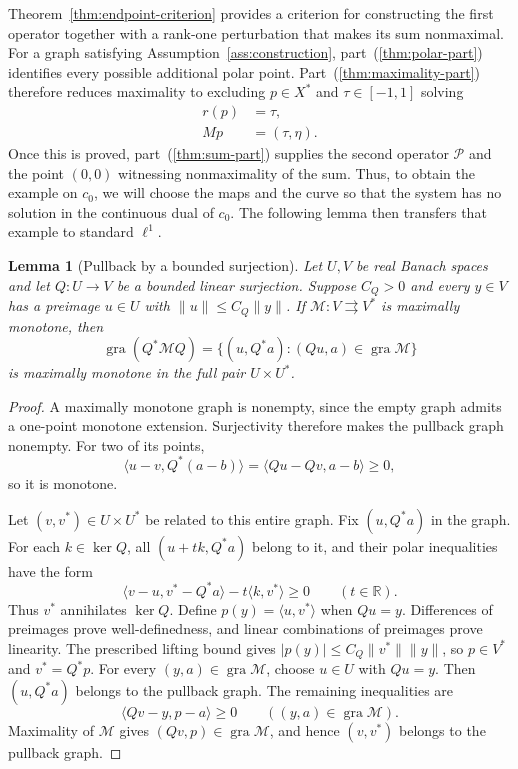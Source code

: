 \documentclass[11pt]{article}
\newcommand{\R}{\mathbb R}
\newcommand{\gra}{\operatorname{gra}}
\newcommand{\pair}[2]{\langle #1,#2\rangle}
\newtheorem{lemma}{Lemma}
\theoremstyle{definition}
\theoremstyle{remark}
\begin{document}
Theorem~\ref{thm:endpoint-criterion} provides a criterion for constructing
the first operator together with a rank-one perturbation that makes its
sum nonmaximal. For a graph satisfying Assumption~\ref{ass:construction}, part~\textup{(\ref{thm:polar-part})}
identifies every possible additional polar point. Part~\textup{(\ref{thm:maximality-part})} therefore
reduces maximality to excluding $p\in X^*$ and $\tau\in[-1,1]$ solving
\[
\begin{aligned}
r(p)&=\tau,\\
Mp&=(\tau,\eta).
\end{aligned}
\]
Once this is proved, part~\textup{(\ref{thm:sum-part})} supplies the second
operator $\mathcal P$ and the point $(0,0)$ witnessing nonmaximality
of the sum. Thus, to obtain the example on $c_0$, we will choose
the maps and the curve so that the system has no solution in
the continuous dual of $c_0$. The following lemma then transfers that example
to standard $\ell^1$.

\begin{lemma}[Pullback by a bounded surjection]
\label{lem:surjection-transport}
Let $U,V$ be real Banach spaces and let $Q:U\to V$ be a bounded
linear surjection. Suppose $C_Q>0$ and every $y\in V$ has a preimage
$u\in U$ with $\|u\|\le C_Q\|y\|$. If
$\mathcal M:V\rightrightarrows V^*$ is maximally monotone, then
\[
\gra(Q^*\mathcal M Q)
=\{(u,Q^*a):(Qu,a)\in\gra\mathcal M\}
\]
is maximally monotone in the full pair $U\times U^*$.
\end{lemma}
\begin{proof}
A maximally monotone graph is nonempty, since the empty graph admits
a one-point monotone extension. Surjectivity therefore makes the
pullback graph nonempty. For two of its points,
\[
\pair{u-v}{Q^*(a-b)}=\pair{Qu-Qv}{a-b}\ge0,
\]
so it is monotone.

Let $(v,v^*)\in U\times U^*$ be related to this entire graph. Fix
$(u,Q^*a)$ in the graph. For each $k\in\ker Q$, all $(u+t k,Q^*a)$ belong to it,
and their polar inequalities have the form
\[
\pair{v-u}{v^*-Q^*a}-t\pair{k}{v^*}\ge0
\qquad(t\in\R).
\]
Thus $v^*$ annihilates $\ker Q$. Define $p(y)=\pair{u}{v^*}$ when
$Qu=y$. Differences of preimages prove well-definedness, and linear
combinations of preimages prove linearity. The prescribed lifting bound
gives $|p(y)|\le C_Q\|v^*\|\|y\|$, so $p\in V^*$ and $v^*=Q^*p$.
For every $(y,a)\in\gra\mathcal M$, choose $u\in U$ with $Qu=y$.
Then $(u,Q^*a)$ belongs to the pullback graph. The remaining
inequalities are
\[
\pair{Qv-y}{p-a}\ge0\qquad((y,a)\in\gra\mathcal M).
\]
Maximality of $\mathcal M$ gives $(Qv,p)\in\gra\mathcal M$, and hence
$(v,v^*)$ belongs to the pullback graph.
\end{proof}
\end{document}
